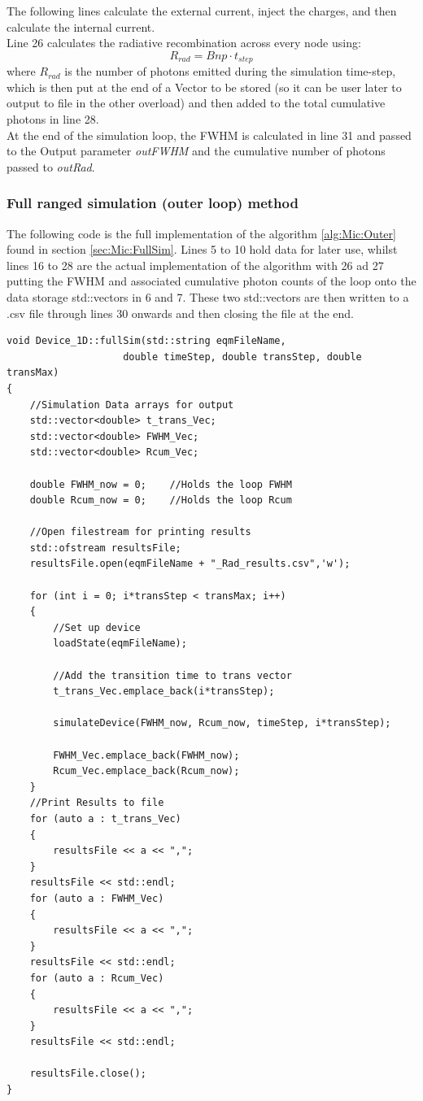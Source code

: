 \documentclass[titlepage]{article}
\begin{document}
The following lines calculate the external current, inject the charges, and then calculate the internal current. \\
Line 26 calculates the radiative recombination across every node using: 
\begin{equation}
	R_{rad} = Bnp\cdot t_{step}
\end{equation}
where $R_{rad}$ is the number of photons emitted during the simulation time-step, which is then put at the end of a Vector to be stored (so it can be user later to output to file in the other overload) and then added to the total cumulative photons in line 28.\\
At the end of the simulation loop, the FWHM is calculated in line 31 and passed to the Output parameter \textit{outFWHM} and the cumulative number of photons passed to \textit{outRad}.\\

\subsubsection{Full ranged simulation (outer loop) method}
The following code is the full implementation of the algorithm \ref{alg:Mic:Outer} found in section \ref{sec:Mic:FullSim}. Lines 5 to 10 hold data for later use, whilst lines 16 to 28 are the actual implementation of the algorithm with 26 ad 27 putting the FWHM and associated cumulative photon counts of the loop onto the data storage std::vectors in 6 and 7. These two std::vectors are then written to a .csv file through lines 30 onwards and then closing the file at the end.
\begin{lstlisting}[caption = Full outer simulation loop method]
void Device_1D::fullSim(std::string eqmFileName, 
					double timeStep, double transStep, double transMax)
{
	//Simulation Data arrays for output
	std::vector<double> t_trans_Vec;
	std::vector<double> FWHM_Vec;
	std::vector<double> Rcum_Vec;
	
	double FWHM_now = 0;	//Holds the loop FWHM
	double Rcum_now = 0;	//Holds the loop Rcum
	
	//Open filestream for printing results
	std::ofstream resultsFile;
	resultsFile.open(eqmFileName + "_Rad_results.csv",'w');
	
	for (int i = 0; i*transStep < transMax; i++)
	{
		//Set up device
		loadState(eqmFileName);
		
		//Add the transition time to trans vector
		t_trans_Vec.emplace_back(i*transStep);
		
		simulateDevice(FWHM_now, Rcum_now, timeStep, i*transStep);
		
		FWHM_Vec.emplace_back(FWHM_now);
		Rcum_Vec.emplace_back(Rcum_now);
	}
	//Print Results to file
	for (auto a : t_trans_Vec)
	{
		resultsFile << a << ",";
	}
	resultsFile << std::endl;
	for (auto a : FWHM_Vec)
	{
		resultsFile << a << ",";
	}
	resultsFile << std::endl;
	for (auto a : Rcum_Vec)
	{
		resultsFile << a << ",";
	}
	resultsFile << std::endl;
	
	resultsFile.close();
}
\end{lstlisting}
\end{document}
